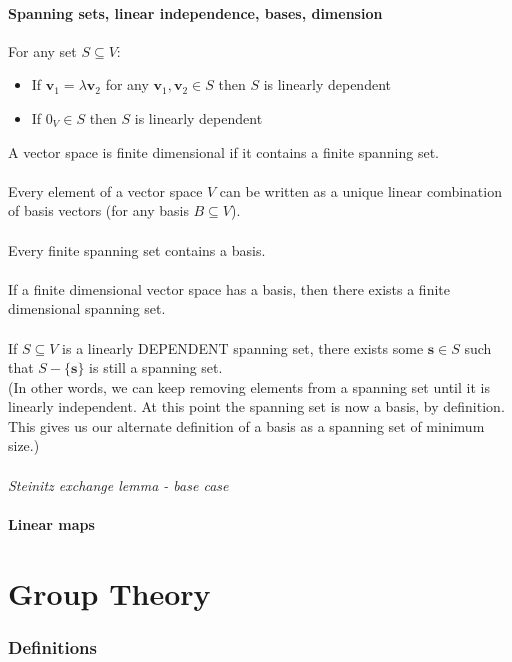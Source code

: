 \documentclass{article}
\renewcommand{\vec}[1]{\mathbf{#1}}
\begin{document}
\subsection{Spanning sets, linear independence, bases, dimension}
For any set $ S \subseteq V $:
\begin{itemize}
\item If $ \vec{v}_{1} = \lambda\vec{v}_{2} $ for any $ \vec{v}_{1}, \vec{v}_{2} \in S $ then $ S $ is linearly dependent
\item If $ 0_{V} \in S $ then $ S $ is linearly dependent
\end{itemize}
A vector space is finite dimensional if it contains a finite spanning set.
\\\\
Every element of a vector space $ V $ can be written as a unique linear combination of basis vectors (for any basis $ B \subseteq V $).
\\\\
Every finite spanning set contains a basis.
\\\\
If a finite dimensional vector space has a basis, then there exists a finite dimensional spanning set.
\\\\
If $ S \subseteq V $ is a linearly DEPENDENT spanning set, there exists some $ \vec{s} \in S $ such that $ S - \{\vec{s}\} $ is still a spanning set.
\\
(In other words, we can keep removing elements from a spanning set until it is linearly independent. At this point the spanning set is now a basis, by definition. This gives us our alternate definition of a basis as a spanning set of minimum size.)
\\\\
\textit{Steinitz exchange lemma - base case}
\\

\subsection{Linear maps}

\newpage
\part{Group Theory}

\section{Definitions}
\end{document}
